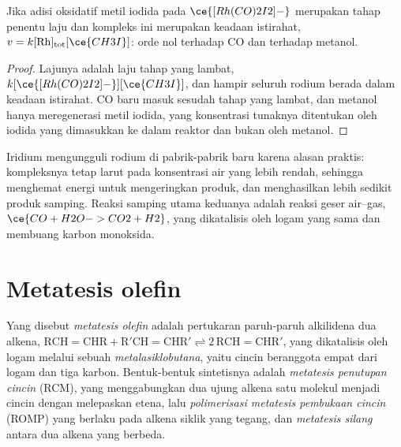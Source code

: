 \begin{proposition}\label{prop:b3:homogeneous-catalysis:monsanto-rate}
Jika adisi oksidatif metil iodida pada $\ce{[Rh(CO)2I2]-}$ merupakan tahap penentu laju dan
kompleks ini merupakan keadaan istirahat, $v = k[\mathrm{Rh}]_{\mathrm{tot}}[\ce{CH3I}]$: orde nol terhadap CO dan terhadap
metanol.
\end{proposition}

\begin{proof}
Lajunya adalah laju tahap yang lambat, $k[\ce{[Rh(CO)2I2]-}][\ce{CH3I}]$, dan hampir seluruh rodium
berada dalam keadaan istirahat. CO baru masuk sesudah tahap yang lambat, dan metanol hanya
meregenerasi metil iodida, yang konsentrasi tunaknya ditentukan oleh iodida yang
dimasukkan ke dalam reaktor dan bukan oleh metanol.
\end{proof}

Iridium mengungguli rodium di pabrik-pabrik baru karena alasan praktis: kompleksnya tetap
larut pada konsentrasi air yang lebih rendah, sehingga menghemat energi untuk mengeringkan
produk, dan menghasilkan lebih sedikit produk samping. Reaksi samping utama keduanya adalah
reaksi geser air--gas, $\ce{CO + H2O -> CO2 + H2}$, yang dikatalisis oleh logam yang sama dan membuang
karbon monoksida.

\section{Metatesis olefin}

\begin{definition}\label{def:b3:homogeneous-catalysis:metathesis}
Yang disebut \emph{metatesis olefin} adalah pertukaran
paruh-paruh alkilidena dua alkena, $\mathrm{RCH{=}CHR + R'CH{=}CHR' \rightleftharpoons 2\,RCH{=}CHR'}$, yang dikatalisis oleh
 logam melalui sebuah \emph{metalasiklobutana},
yaitu cincin beranggota empat dari logam dan tiga karbon. Bentuk-bentuk sintetisnya adalah
\emph{metatesis penutupan cincin} (RCM), yang menggabungkan
dua ujung alkena satu molekul menjadi cincin dengan melepaskan etena,
lalu \emph{polimerisasi metatesis pembukaan cincin} (ROMP) yang
berlaku pada alkena siklik yang tegang, dan \emph{metatesis
silang} antara dua alkena yang berbeda.
\end{definition}

